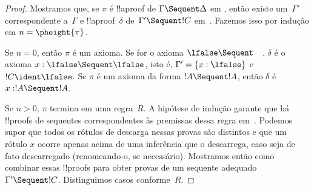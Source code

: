 \documentclass[../../../include/open-logic-section]{subfiles}
\begin{document}
\begin{proof}
  Mostramos que, se $\pi$ é !!a{proof} de $\Gamma \Sequent \Delta$ em
  , então existe um~$\Gamma'$ correspondente a~$\Gamma$ e
  !!a{proof}~$\delta$ de~$\Gamma' \Sequent !C$ em~. Fazemos
  isso por indução em $n = \pheight{\pi}$.

  Se $n = 0$, então $\pi$ é um axioma. Se for o axioma $\lfalse \Sequent
  \quad$, $\delta$ é o axioma $x:\lfalse \Sequent \lfalse$, isto é,
  $\Gamma' = \{x:\lfalse\}$ e $!C \ident \lfalse$. Se $\pi$ é um
  axioma da forma $!A \Sequent !A$, então $\delta$ é $x: !A \Sequent !A$.
  
  Se $n>0$, $\pi$ termina em uma regra~$R$. A hipótese de indução
  garante que há !!{proof}s de sequentes correspondentes às premissas
  dessa regra em~. Podemos supor que todos os rótulos de
  descarga nessas provas são distintos e que um rótulo $x$ ocorre
  apenas acima de uma inferência que o descarrega, caso seja de fato
  descarregado (renomeando-o, se necessário). Mostramos então como
  combinar essas !!{proof}s para obter provas de um sequente adequado
  $\Gamma' \Sequent !C$. Distinguimos casos conforme~$R$.


\end{proof}
\end{document}
